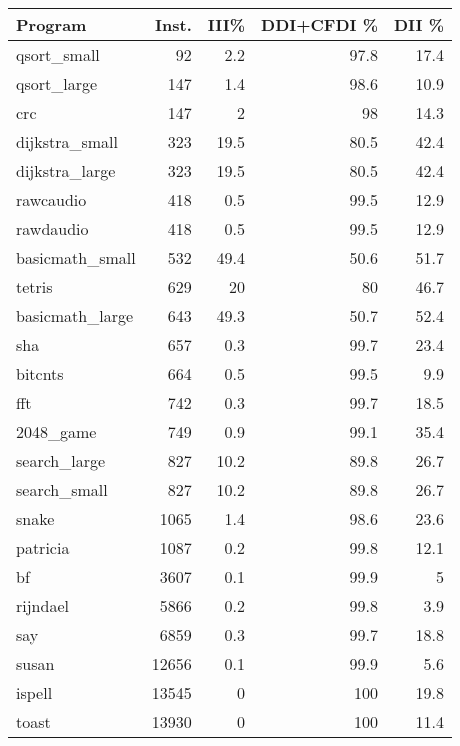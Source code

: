 \begin{tabular}{lrrrr}
\hline
 Program         &   Inst. &   III\% &   DDI+CFDI \% &   DII \% \\
\hline
 qsort\_small     &      92 &    2.2 &         97.8 &    17.4 \\
 qsort\_large     &     147 &    1.4 &         98.6 &    10.9 \\
 crc             &     147 &    2   &         98   &    14.3 \\
 dijkstra\_small  &     323 &   19.5 &         80.5 &    42.4 \\
 dijkstra\_large  &     323 &   19.5 &         80.5 &    42.4 \\
 rawcaudio       &     418 &    0.5 &         99.5 &    12.9 \\
 rawdaudio       &     418 &    0.5 &         99.5 &    12.9 \\
 basicmath\_small &     532 &   49.4 &         50.6 &    51.7 \\
 tetris          &     629 &   20   &         80   &    46.7 \\
 basicmath\_large &     643 &   49.3 &         50.7 &    52.4 \\
 sha             &     657 &    0.3 &         99.7 &    23.4 \\
 bitcnts         &     664 &    0.5 &         99.5 &     9.9 \\
 fft             &     742 &    0.3 &         99.7 &    18.5 \\
 2048\_game       &     749 &    0.9 &         99.1 &    35.4 \\
 search\_large    &     827 &   10.2 &         89.8 &    26.7 \\
 search\_small    &     827 &   10.2 &         89.8 &    26.7 \\
 snake           &    1065 &    1.4 &         98.6 &    23.6 \\
 patricia        &    1087 &    0.2 &         99.8 &    12.1 \\
 bf              &    3607 &    0.1 &         99.9 &     5   \\
 rijndael        &    5866 &    0.2 &         99.8 &     3.9 \\
 say             &    6859 &    0.3 &         99.7 &    18.8 \\
 susan           &   12656 &    0.1 &         99.9 &     5.6 \\
 ispell          &   13545 &    0   &        100   &    19.8 \\
 toast           &   13930 &    0   &        100   &    11.4 \\

\end{tabular}
